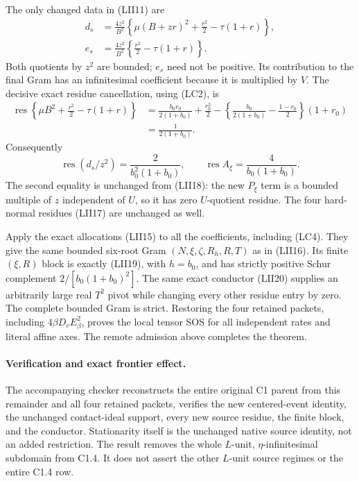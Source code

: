 The only changed data in (LII11) are
\[
\begin{split}
 d_s&=\frac{4z^2}{B^2}
   \left\{\mu(B+zr)^2+\frac{r^2}{2}-\tau(1+r)\right\},\\
 e_s&=\frac{4z^2}{B^2}
   \left\{\frac{r^2}{2}-\tau(1+r)\right\}.
\end{split}                                             \tag{LC5}
\]
Both quotients by $z^2$ are bounded; $e_s$ need not be positive.
Its contribution to the final Gram has an infinitesimal coefficient
because it is multiplied by $V$.  The decisive exact residue
cancellation, using (LC2), is
\[
 \begin{split}
 \operatorname{res}\left\{
 \mu B^2+\frac{r^2}{2}-\tau(1+r)\right\}
 &=\frac{b_0r_0}{2(1+b_0)}+\frac{r_0^2}{2}
 -\left\{\frac{b_0}{2(1+b_0)}-\frac{1-r_0}{2}\right\}(1+r_0)\\
 &=\frac1{2(1+b_0)}.
 \end{split}                                             \tag{LC6}
\]
Consequently
\[
 \operatorname{res}(d_s/z^2)=\frac2{b_0^2(1+b_0)},\qquad
 \operatorname{res}A_\xi=\frac4{b_0(1+b_0)}.              \tag{LC7}
\]
The second equality is unchanged from (LII18): the new $P_\xi$
term is a bounded multiple of $z$ independent of $U$, so it has
zero $U$-quotient residue.  The four hard-normal residues (LII17)
are unchanged as well.

Apply the exact allocations (LII15) to all the coefficients,
including (LC4).  They give the same bounded six-root Gram
$(N,\xi,\zeta,R_h,R,T)$ as in (LII16).  Its finite $(\xi,R)$
block is exactly (LII19), with $h=b_0$, and has strictly positive
Schur complement $2/[b_0(1+b_0)^2]$.  The same exact conductor
(LII20) supplies an arbitrarily large real $T^2$ pivot while
changing every other residue entry by zero.  The complete bounded
Gram is strict.  Restoring the four retained packets, including
$4\beta D_vE_\beta^2$, proves the local tensor SOS for all
independent rates and literal affine axes.  The remote admission
above completes the theorem.

\paragraph{Verification and exact frontier effect.}
The accompanying checker reconstructs the entire original C1 parent
from this remainder and all four retained packets, verifies the new
centered-event identity, the unchanged contact-ideal support, every
new source residue, the finite block, and the conductor.  Stationarity
itself is the unchanged native source identity, not an added
restriction.  The result removes the whole $L$-unit, $\eta$-infinitesimal
subdomain from C1.4.  It does not assert the other $L$-unit source
regimes or the entire C1.4 row.
